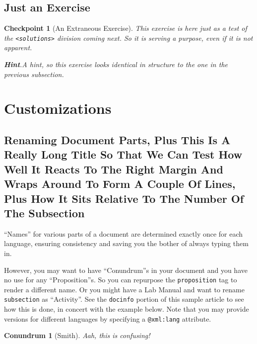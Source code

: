 \documentclass{sn-jnl}
\theoremstyle{thmstyleone}%
\newtheorem{proposition}[theorem]{Conundrum}
\theoremstyle{thmstyletwo}%
\newtheorem{inlineexercise}[theorem]{Checkpoint}
\theoremstyle{thmstylethree}%
\newcommand{\blocktitlefont}{\relax}
\newcommand{\mono}[1]{\texttt{#1}}
\numberwithin{equation}{section}
\begin{document}
\subsection{Just an Exercise}\label{section-advanced-numbering-12}%
\begin{inlineexercise}[An Extraneous Exercise]\label{section-advanced-numbering-12-2}%
%
This exercise is here just as a test of the \mono{<solutions>} division coming next.  So it is serving a purpose, even if it is not apparent.%
\par\smallskip%
\noindent\textbf{\blocktitlefont Hint}.\hypertarget{section-advanced-numbering-12-2-3}{}\quad{}A hint, so this exercise looks identical in structure to the one in the previous subsection.%
\end{inlineexercise}%
%
%
\typeout{************************************************}
\typeout{************************************************}
%
\section{Customizations}\label{section-customizations}%
%
%
\typeout{************************************************}
\typeout{************************************************}
%
\subsection{Renaming Document Parts, Plus This Is A Really Long Title So That We Can Test How Well It Reacts To The Right Margin And Wraps Around To Form A Couple Of Lines, Plus How It Sits Relative To The Number Of The Subsection}\label{rename-facility}%
``Names'' for various parts of a document are determined exactly once for each language, ensuring consistency and saving you the bother of always typing them in.%
\par
However, you may want to have ``Conundrum''s in your document and you have no use for any ``Proposition''s.  So you can repurpose the \mono{proposition} tag to render a different name.  Or you might have a Lab Manual and want to rename \mono{subsection} as ``Activity''.  See the \mono{docinfo} portion of this sample article to see how this is done, in concert with the example below.  Note that you may provide versions for different languages by specifying a \mono{@xml:lang} attribute.%
\begin{proposition}[Smith]\label{proposition-as-conundrum}%
%
Aah, this \emph{is} confusing!%
\end{proposition}
\end{document}

